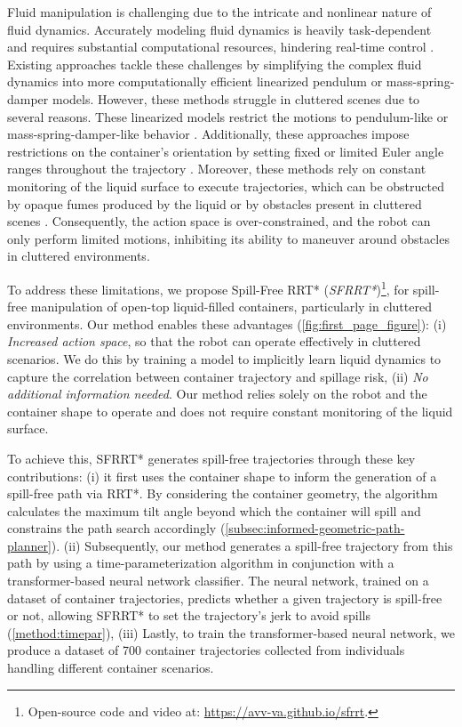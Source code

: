 Fluid manipulation is challenging due to the intricate and nonlinear nature of fluid dynamics. Accurately modeling fluid dynamics is heavily task-dependent and requires substantial computational resources, hindering real-time control \cite{systemstudy1, systemstudy2}. Existing approaches tackle these challenges by simplifying the complex fluid dynamics into more computationally efficient linearized pendulum or mass-spring-damper models. However, these methods struggle in cluttered scenes due to several reasons. These linearized models restrict the motions to pendulum-like or mass-spring-damper-like behavior \cite{pendulum2, pendulum2018, pendulum, springdamper2022, springdamper2021, pendulum2019}. Additionally, these approaches impose restrictions on the container's orientation by setting fixed or limited Euler angle ranges throughout the trajectory \cite{pendulum, springdamper2021}. Moreover, these methods rely on constant monitoring of the liquid surface to execute trajectories, which can be obstructed by opaque fumes produced by the liquid or by obstacles present in cluttered scenes \cite{spill1, pendulum2019,montazeri2013chemical}. Consequently, the action space is over-constrained, and the robot can only perform limited motions, inhibiting its ability to maneuver around obstacles in cluttered environments.


To address these limitations, we propose Spill-Free RRT* (\textit{SFRRT*})\footnote{Open-source code and video at: \href{https://avv-va.github.io/sfrrt}{https://avv-va.github.io/sfrrt}.}, for spill-free manipulation of open-top liquid-filled containers, particularly in cluttered environments. Our method enables these advantages (\cref{fig:first_page_figure}):
(i) \textsl{Increased action space}, so that the robot can operate effectively in cluttered scenarios. We do this by training a model to implicitly learn liquid dynamics to capture the correlation between container trajectory and spillage risk, 
(ii) \textsl{No additional information needed}. Our method relies solely on the robot and the container shape to operate and does not require constant monitoring of the liquid surface. 


To achieve this, SFRRT* generates spill-free trajectories through these key contributions: (i) it first uses the container shape to inform the generation of a spill-free path via RRT*. By considering the container geometry, the algorithm calculates the maximum tilt angle beyond which the container will spill and constrains the path search accordingly (\cref{subsec:informed-geometric-path-planner}). (ii) Subsequently, our method generates a spill-free trajectory from this path by using a time-parameterization algorithm in conjunction with a transformer-based neural network classifier. The neural network, trained on a dataset of container trajectories, predicts whether a given trajectory is spill-free or not, allowing SFRRT* to set the trajectory's jerk to avoid spills (\cref{method:timepar}), (iii) Lastly, to train the transformer-based neural network, we produce a dataset of 700 container trajectories collected from individuals handling different container scenarios.



